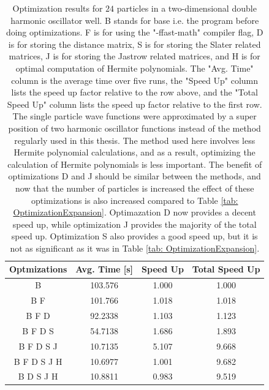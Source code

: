 \documentclass[../main.tex]{subfiles}
\begin{document}
\begin{table}[!ht]
  \centering
  \begin{tabular}{| c | c | c | c |}
    \hline
    Optmizations & Avg. Time [s] & Speed Up & Total Speed Up\\*
    \hline
    B & 103.576 & 1.000 & 1.000\\*
    \hline
    B F & 101.766 & 1.018 & 1.018\\*
    \hline
    B F D & 92.2338 & 1.103 & 1.123\\*
    \hline
    B F D S & 54.7138 & 1.686 & 1.893\\*
    \hline
    B F D S J & 10.7135 & 5.107 & 9.668\\*
    \hline
    B F D S J H & 10.6977 & 1.001 & 9.682\\*
    \hline
    B D S J H & 10.8811 & 0.983 & 9.519\\*
    \hline
  \end{tabular}
  \caption{Optimization results for $24$ particles in a two-dimensional double harmonic oscillator well. B stands for base i.e. the program before doing optimizations. F is for using the "-ffast-math" compiler flag, D is for storing the distance matrix, S is for storing the Slater related matrices, J is for storing the Jastrow related matrices, and H is for optimal computation of Hermite polynomials. The "Avg. Time" column is the average time over five runs, the "Speed Up" column lists the speed up factor relative to the row above, and the "Total Speed Up" column lists the speed up factor relative to the first row. The single particle wave functions were approximated by a super position of two harmonic oscillator functions instead of the method regularly used in this thesis. The method used here involves less Hermite polynomial calculations, and as a result, optimizing the calculation of Hermite polynomials is less important. The benefit of optimizations D and J should be similar between the methods, and now that the number of particles is increased the effect of these optimizations is also increased compared to Table \ref{tab: OptimizationExpansion}. Optimazation D now provides a decent speed up, while optimization J provides the majority of the total speed up. Optimization S also provides a good speed up, but it is not as significant as it was in Table \ref{tab: OptimizationExpansion}.}
  \label{tab: OptimizationSupPos}
\end{table}
\end{document}
